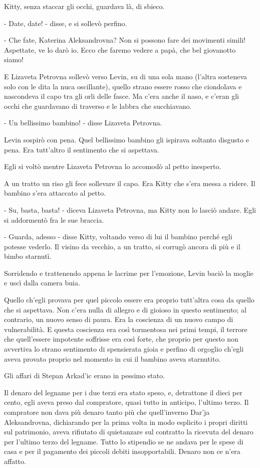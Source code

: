 Kitty, senza staccar gli occhi, guardava là, di sbieco. 

- Date, date! - disse, e si sollevò perfino. 

- Che fate, Katerina Aleksandrovna? Non si possono fare dei movimenti simili! Aspettate, ve lo darò io. Ecco che faremo vedere a papà, che bel giovanotto siamo! 

E Lizaveta Petrovna sollevò verso Levin, su di una sola mano (l'altra sosteneva solo con le dita la nuca oscillante), quello strano essere rosso che ciondolava e nascondeva il capo tra gli orli delle fasce. Ma c'era anche il naso, e c'eran gli occhi che guardavano di traverso e le labbra che succhiavano. 

- Un bellissimo bambino! - disse Lizaveta Petrovna. 

Levin sospirò con pena. Quel bellissimo bambino gli ispirava soltanto disgusto e pena. Era tutt'altro il sentimento che si aspettava. 

Egli si voltò mentre Lizaveta Petrovna lo accomodò al petto inesperto. 

A un tratto un riso gli fece sollevare il capo. Era Kitty che s'era messa a ridere. Il bambino s'era attaccato al petto. 

- Su, basta, basta! - diceva Lizaveta Petrovna, ma Kitty non lo lasciò andare. Egli si addormentò fra le sue braccia. 

- Guarda, adesso - disse Kitty, voltando verso di lui il bambino perché egli potesse vederlo. Il visino da vecchio, a un tratto, si corrugò ancora di più e il bimbo starnutì. 

Sorridendo e trattenendo appena le lacrime per l'emozione, Levin baciò la moglie e uscì dalla camera buia. 

Quello ch'egli provava per quel piccolo essere era proprio tutt'altra cosa da quello che si aspettava. Non c'era nulla di allegro e di gioioso in questo sentimento; al contrario, un nuovo senso di paura. Era la coscienza di un nuovo campo di vulnerabilità. E questa coscienza era così tormentosa nei primi tempi, il terrore che quell'essere impotente soffrisse era così forte, che proprio per questo non avvertiva lo strano sentimento di spensierata gioia e perfino di orgoglio ch'egli aveva provato proprio nel momento in cui il bambino aveva starnutito. 

\label{xvii-6} 

Gli affari di Stepan Arkad'ic erano in pessimo stato. 

Il denaro del legname per i due terzi era stato speso, e, detrattone il dieci per cento, egli aveva preso dal compratore, quasi tutto in anticipo, l'ultimo terzo. Il compratore non dava più denaro tanto più che quell'inverno Dar'ja Aleksandrovna, dichiarando per la prima volta in modo esplicito i propri diritti sul patrimonio, aveva rifiutato di quietanzare sul contratto la ricevuta del denaro per l'ultimo terzo del legname. Tutto lo stipendio se ne andava per le spese di casa e per il pagamento dei piccoli debiti insopportabili. Denaro non ce n'era affatto. 

